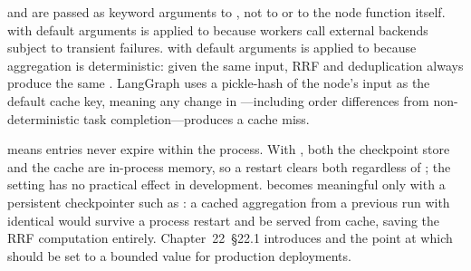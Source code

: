  and  are passed as keyword arguments
to , not to  or to the node function itself.
 with default arguments is applied to
 because workers call external backends subject to
transient failures.  with default arguments is applied
to  because aggregation is deterministic: given the same
 input, RRF and deduplication always produce the
same . LangGraph uses a pickle-hash of the node's
input as the default cache key, meaning any change in
---including order differences from non-deterministic
task completion---produces a cache miss.

\begin{notebox}
 means entries never expire within the
process. With , both the checkpoint store and the cache
are in-process memory, so a restart clears both regardless of
; the setting has no practical effect in development.
 becomes meaningful only with a persistent checkpointer such as
: a cached aggregation from a previous run with
identical  would survive a process restart and be
served from cache, saving the RRF computation entirely. Chapter~22~\S22.1
introduces  and the point at which 
should be set to a bounded value for production deployments.
\end{notebox}


